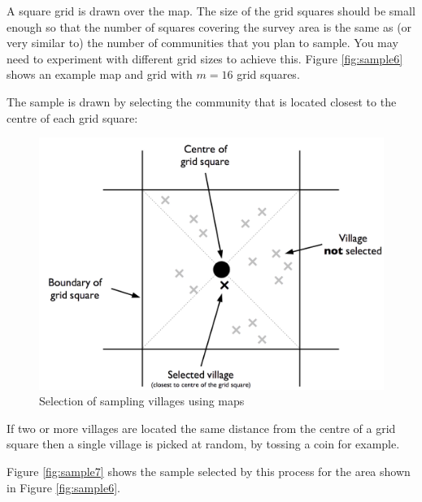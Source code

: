 \documentclass[12pt,a4paper]{book}
\theoremstyle{definition}
\theoremstyle{definition}
\theoremstyle{definition}
\theoremstyle{remark}
\begin{document}
A square grid is drawn over the map. The size of the grid squares should
be small enough so that the number of squares covering the survey area
is the same as (or very similar to) the number of communities that you
plan to sample. You may need to experiment with different grid sizes to
achieve this. Figure \ref{fig:sample6} shows an example map and grid
with \(m = 16\) grid squares.

The sample is drawn by selecting the community that is located closest
to the centre of each grid square:

\begin{figure}[H]

{\centering \includegraphics{figures/mapSample1} 

}

\caption{Selection of sampling villages using maps}\label{fig:sample5}
\end{figure}

If two or more villages are located the same distance from the centre of
a grid square then a single village is picked at random, by tossing a
coin for example.

Figure \ref{fig:sample7} shows the sample selected by this process for
the area shown in Figure \ref{fig:sample6}.
\end{document}
